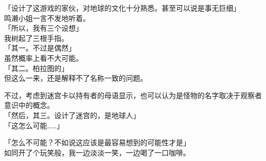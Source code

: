 「设计了这游戏的家伙，对地球的文化十分熟悉。甚至可以说是事无巨细」\\

鸣濑小姐一言不发地听着。\\

「所以，我有三个设想」\\

我树起了三根手指。\\

「其一。不过是偶然」\\

虽然概率上看不大可能。\\

「其二。柏拉图的」\\

但这么一来，还是解释不了名称一致的问题。

不过，考虑到迷宫卡以持有者的母语显示，也可以认为是怪物的名字取决于观察者意识中的概念。\\

「然后，其三。设计了迷宫的，是地球人」\\

「这怎么可能……」

「怎么不可能？不如说这应该是最容易想到的可能性才是」\\

如同开了个玩笑般，我一边淡淡一笑，一边喝了一口咖啡。\\

